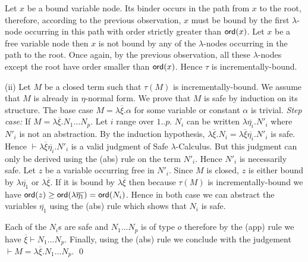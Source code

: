 \documentclass{llncs}
\newcommand\ord[1]{{\sf ord}(#1)}
\begin{document}
Let $x$ be a bound variable node. Its binder occurs in the path from $x$
to the root, therefore, according to the previous observation, $x$ must be bound
by the first $\lambda$-node occurring in this path with order strictly
greater than $\ord{x}$. Let $x$ be a free variable node then $x$ is not bound
by any of the $\lambda$-nodes occurring in the path to the root. Once again, by the previous observation, all
these $\lambda$-nodes except the root have order smaller than $\ord{x}$. Hence
$\tau$ is incrementally-bound.

(ii) Let $M$ be a closed term such that $\tau(M)$ is incrementally-bound.
We assume that $M$ is already in $\eta$-normal form.
We prove that $M$ is safe by induction on its structure. The base case $M =
\lambda \overline{\xi} . \alpha$ for some variable or constant
$\alpha$ is trivial.
\emph{Step case:} If $M = \lambda \overline{\xi} . N_1 \ldots N_p$.
Let $i$ range over $1..p$. $N_i$ can be written $\lambda
\overline{\eta_i} . N'_i$ where $N'_i$ is not an abstraction. By the
induction hypothesis, $\lambda \overline{\xi} . N_i = \lambda
\overline{\xi} \overline{\eta_i} . N'_i$ is safe.
Hence $\vdash \lambda \overline{\xi} \overline{\eta_i} . N'_i$
is a valid judgment of Safe $\lambda$-Calculus.
But this judgment can only be derived using the (abs) rule on the term $N'_i$. Hence
$N'_i$ is necessarily safe. Let $z$ be a variable occurring free in
$N'_i$. Since $M$ is closed, $z$ is either bound by $\lambda
\overline{\eta_1}$ or $\lambda \overline{\xi}$. If it is bound by
$\lambda \overline{\xi}$ then because $\tau(M)$ is
incrementally-bound we have $\ord{z} \geq \ord{\lambda
\overline{\eta_1}} = \ord{N_i}$. Hence in both case we can abstract the variables
$\overline{\eta_1}$ using the (abs) rule which shows that $N_i$ is safe.

Each of the $N_i$s are safe and $N_1 \ldots N_p$ is of type $o$ therefore
by the (app) rule we have $\overline{\xi} \vdash N_1 \ldots N_p$. Finally, using the (abs) rule we conclude
with the judgement $\vdash M = \lambda \overline{\xi} . N_1 \ldots N_p$.
\qed
\end{document}
